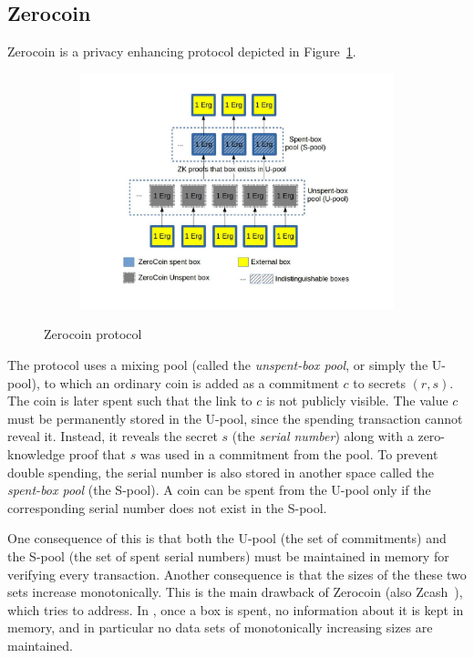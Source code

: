 \documentclass[runningheads]{llncs}
\begin{document}
\subsection{Zerocoin}
\label{zerocoin} 

Zerocoin is a privacy enhancing protocol depicted in Figure~\ref{fig:zerocoin}. 

\begin{figure}[h]
	\centering
	\begin{subfigure}{.8\textwidth}
		\centering
		\includegraphics[width=\linewidth]{ZeroCoin.jpg}
	\end{subfigure}
	\caption{Zerocoin protocol}
	\label{fig:zerocoin}
\end{figure}

The protocol uses a mixing pool (called the {\em unspent-box pool}, or simply the U-pool), to which an ordinary coin is added as a commitment $c$ to secrets $(r, s)$. The coin is later spent such that the link to $c$ is not publicly visible. The value $c$ must be permanently stored in the U-pool, since the spending transaction cannot reveal it. Instead, it reveals the secret $s$ (the {\em serial number}) along with a zero-knowledge proof that $s$ was used in a commitment from the pool. To prevent double spending, the serial number is also stored in another space called the {\em spent-box pool} (the S-pool). A coin can be spent from the U-pool only if the corresponding serial number does not exist in the S-pool. 

One consequence of this is that both the U-pool (the set of commitments) and the S-pool (the set of spent serial numbers) must be maintained in memory for verifying every transaction. 
Another consequence is that the sizes of the these two sets increase monotonically. 
This is the main drawback of Zerocoin (also Zcash~\cite{zcash}), which \algname tries to address. 
In \algname, once a box is spent, no information about it is kept in memory, and in particular no data sets of monotonically increasing sizes are maintained. 
\end{document}

